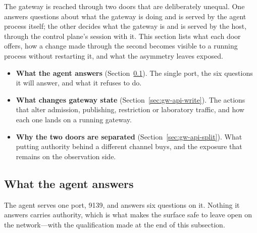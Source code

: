 \documentclass[12pt,a4paper]{report}
\begin{document}
The gateway is reached through two doors that are deliberately unequal.
One answers questions about what the gateway is doing and is served by
the agent process itself; the other decides what the gateway is and is
served by the host, through the control plane's session with it. This
section lists what each door offers, how a change made through the
second becomes visible to a running process without restarting it, and
what the asymmetry leaves exposed.

\begin{itemize}
    \item \textbf{What the agent answers}
    (Section~\ref{sec:gw-api-read}).
    The single port, the six questions it will answer, and what it
    refuses to do.
    \item \textbf{What changes gateway state}
    (Section~\ref{sec:gw-api-write}).
    The actions that alter admission, publishing, restriction or
    laboratory traffic, and how each one lands on a running gateway.
    \item \textbf{Why the two doors are separated}
    (Section~\ref{sec:gw-api-split}).
    What putting authority behind a different channel buys, and the
    exposure that remains on the observation side.
\end{itemize}

\subsection{What the agent answers}
\label{sec:gw-api-read}

The agent serves one port, 9139, and answers six questions on it.
Nothing it answers carries authority, which is what makes the surface
safe to leave open on the network---with the qualification made at the
end of this subsection.
\end{document}
